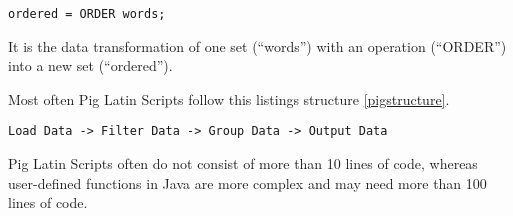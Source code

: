 \begin{lstlisting}[language=pig,caption=A typical Pig line of code,label=pigsample]
ordered = ORDER words;
\end{lstlisting}

It is the data transformation of one set (``words'') with an operation (``ORDER'') into a new set (``ordered'').

Most often Pig Latin Scripts follow this listings structure \ref{pigstructure}.

\begin{lstlisting}[language=pig,caption=Pig Latin Script Structure ,label=pigstructure]
Load Data -> Filter Data -> Group Data -> Output Data
\end{lstlisting}
                                                     
Pig Latin Scripts often do not consist of more than 10 lines of code, whereas user-defined functions in Java are more complex and may need more than 100 lines of code.
                                                                                                               